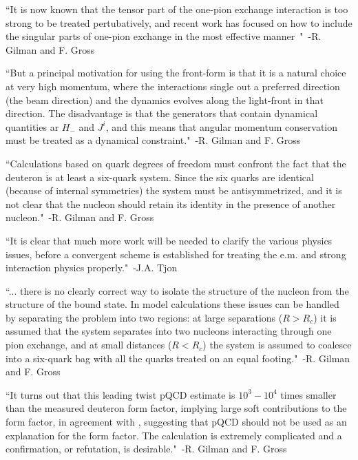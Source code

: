 ``It is now known that the tensor part of the one-pion exchange interaction is too strong to be treated pertubatively, and recent work has focused on how to include the singular parts of one-pion exchange in the most effective manner~\cite{Phillips:1999hh,Phillips:1999am,Walzl:2001vb}"~-R. Gilman and F. Gross~\cite{Gilman:2001yh}

``But a principal motivation for using the front-form is that it is a natural choice at very high momentum, where the interactions single out a preferred direction (the beam direction) and the dynamics evolves along the light-front in that direction. The disadvantage is that the generators that contain dynamical quantities ar $H_{-}$ and $J^i$, and this means that angular momentum conservation must be treated as a dynamical constraint."~-R. Gilman and F. Gross~\cite{Gilman:2001yh}

``Calculations based on quark degrees of freedom must confront the fact that the deuteron is at least a six-quark system. Since the six quarks are identical (because of internal symmetries) the system must be antisymmetrized, and it is not clear that the nucleon should retain its identity in the presence of another nucleon."~-R. Gilman and F. Gross~\cite{Gilman:2001yh}

``It is clear that much more work will be needed to clarify the various physics issues, before a convergent scheme is established for treating the e.m. and strong interaction physics properly."~-J.A. Tjon~\cite{Tjon.48218}

``... there is no clearly correct way to isolate the structure of the nucleon from the structure of the bound state. In model calculations these issues can be handled by separating the problem into two regions: at large separations ($R>R_c$) it is assumed that the system separates into two nucleons interacting through one pion exchange, and at small distances ($R<R_c$) the system is assumed to coalesce into a six-quark bag with all the quarks treated on an equal footing."~-R. Gilman and F. Gross~\cite{Gilman:2001yh}

``It turns out that this leading twist pQCD estimate is $10^3-10^4$ times smaller than the measured deuteron form factor, implying large soft contributions to the form factor, in agreement with \cite{Isgur:1988iw,Radyushkin:1990te}, suggesting that pQCD should not be used as an explanation for the form factor. The calculation is extremely complicated and a confirmation, or refutation, is desirable."~-R. Gilman and F. Gross~\cite{Gilman:2001yh}
